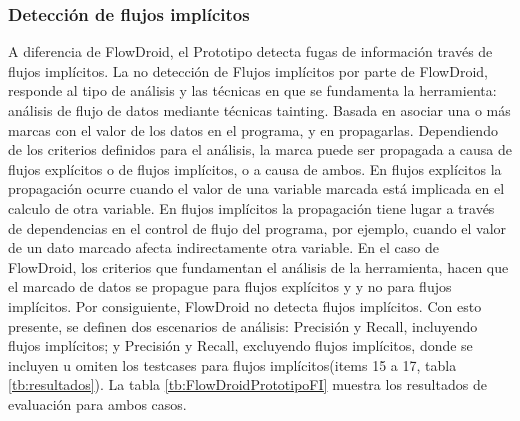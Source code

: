 \subsubsection{Detección de flujos implícitos}
A diferencia de FlowDroid, el Prototipo detecta fugas de información través de
flujos implícitos. La no detección de Flujos implícitos por parte de FlowDroid,
responde al tipo de análisis y las técnicas en que se fundamenta la herramienta:
análisis de flujo de datos mediante técnicas tainting. Basada en 
% 
% 
asociar una o más marcas
con el valor de los datos en el programa, y en propagarlas. Dependiendo de los
criterios definidos para el análisis, la marca puede ser propagada a causa de
flujos explícitos o de flujos implícitos\cite{taint-analysis}, o a causa de
ambos. En flujos explícitos la propagación ocurre cuando el valor de una variable marcada está
implicada en el calculo de otra variable. En flujos implícitos la propagación
tiene lugar a través de dependencias en el control de flujo del programa, por
ejemplo, cuando el valor de un dato marcado afecta indirectamente otra variable.\newline 
En el caso de FlowDroid, los criterios que fundamentan el análisis de la
herramienta, hacen que el marcado de datos se propague para flujos explícitos y
y no para flujos implícitos. Por consiguiente, FlowDroid no detecta flujos
implícitos.\newline
Con esto presente, se definen dos escenarios de análisis: Precisión y Recall,
incluyendo flujos implícitos; y  Precisión y Recall, excluyendo flujos
implícitos, donde se incluyen u omiten los testcases para flujos
implícitos(items 15 a 17, tabla \ref{tb:resultados}).\newline
La tabla \ref{tb:FlowDroidPrototipoFI} muestra los resultados de evaluación para
ambos casos.\newline
